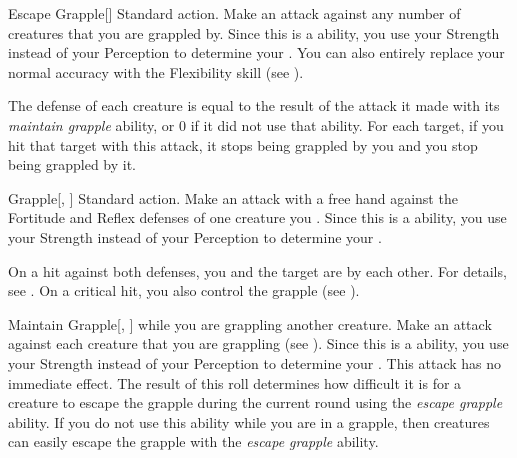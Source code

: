         \begin{activeability}{Escape Grapple}[]
            \label{Escape Grapple}
            \abilityusagetime Standard action.
            \rankline
            Make an attack against any number of creatures that you are grappled by.
            Since this is a  ability, you use your Strength instead of your Perception to determine your .
            You can also entirely replace your normal accuracy with the Flexibility skill (see ).

            The defense of each creature is equal to the result of the attack it made with its \textit{maintain grapple} ability, or 0 if it did not use that ability.
            For each target, if you hit that target with this attack, it stops being grappled by you and you stop being grappled by it.
        \end{activeability}

        \begin{activeability}{Grapple}[, ]
            \abilityusagetime Standard action.
            \rankline
            Make an attack with a free hand against the Fortitude and Reflex defenses of one creature you .
            Since this is a  ability, you use your Strength instead of your Perception to determine your .

            On a hit against both defenses, you and the target are \grappled by each other.
            For details, see .
            On a critical hit, you also control the grapple (see ).
        \end{activeability}

        \begin{activeability}{Maintain Grapple}[, ]
            \label{Maintain Grapple}
            \abilityusagetime {} while you are grappling another creature.
            \rankline
            Make an attack against each creature that you are grappling (see ).
            Since this is a  ability, you use your Strength instead of your Perception to determine your .
            This attack has no immediate effect.
            The result of this roll determines how difficult it is for a creature to escape the grapple during the current round using the \textit{escape grapple} ability.
            If you do not use this ability while you are in a grapple, then creatures can easily escape the grapple with the \textit{escape grapple} ability.
        \end{activeability}

